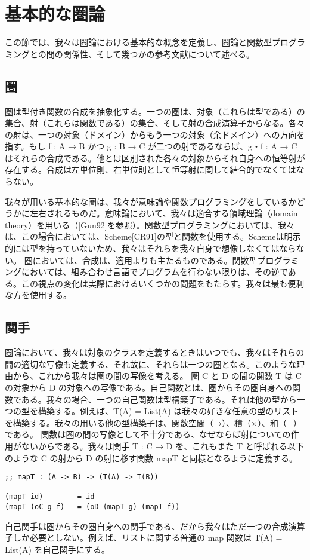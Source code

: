 \documentclass[11pt, oneside]{jsbook}   	%
\begin{document}
\section{基本的な圏論}
この節では、我々は圏論における基本的な概念を定義し、圏論と関数型プログラミングとの間の関係性、そして幾つかの参考文献について述べる。

\subsection{ 圏 }
圏は型付き関数の合成を抽象化する。一つの圏は、対象（これらは型である）の集合、射（これらは関数である）の集合、そして射の合成演算子からなる。各々の射は、一つの対象（ドメイン）からもう一つの対象（余ドメイン）への方向を指す。もし f : A → B かつ g : B → C が二つの射であるならば、g・f : A → C はそれらの合成である。他とは区別された各々の対象からそれ自身への恒等射が存在する。合成は左単位則、右単位則として恒等射に関して結合的でなくてはならない。

我々が用いる基本的な圏は、我々が意味論や関数プログラミングをしているかどうかに左右されるものだ。意味論において、我々は適合する領域理論（domain theory）を用いる（[Gun92]を参照）。関数型プログラミングにおいては、我々は、この場合においては、Scheme[CR91]の型と関数を使用する。Schemeは明示的には型を持っていないため、我々はそれらを我々自身で想像しなくてはならない。
圏においては、合成は、適用よりも主たるものである。関数型プログラミングにおいては、組み合わせ言語でプログラムを行わない限りは、その逆である。この視点の変化は実際におけるいくつかの問題をもたらす。我々は最も便利な方を使用する。
\subsection{ 関手 }
圏論において、我々は対象のクラスを定義するときはいつでも、我々はそれらの間の適切な写像も定義する、それ故に、それらは一つの圏となる。このような理由から、これから我々は圏の間の写像を考える。
圏 C と D の間の関数 T は C の対象から D の対象への写像である。自己関数とは、圏からその圏自身への関数である。我々の場合、一つの自己関数は型構築子である。それは他の型から一つの型を構築する。例えば、T(A) = List(A) は我々の好きな任意の型のリストを構築する。我々の用いる他の型構築子は、関数空間（→）、積（×）、和（+）である。
関数は圏の間の写像として不十分である、なぜならば射についての作用がないからである。我々は関手 T : C → D を、これもまた T と呼ばれる以下のような C の射から D の射に移す関数 mapT と同様となるように定義する。
\begin{lstlisting}
;; mapT : (A -> B) -> (T(A) -> T(B))

(mapT id)        = id
(mapT (oC g f)   = (oD (mapT g) (mapT f))
\end{lstlisting}
自己関手は圏からその圏自身への関手である、だから我々はただ一つの合成演算子しか必要としない。例えば、リストに関する普通の map 関数は T(A) = List(A) を自己関手にする。
\end{document}
